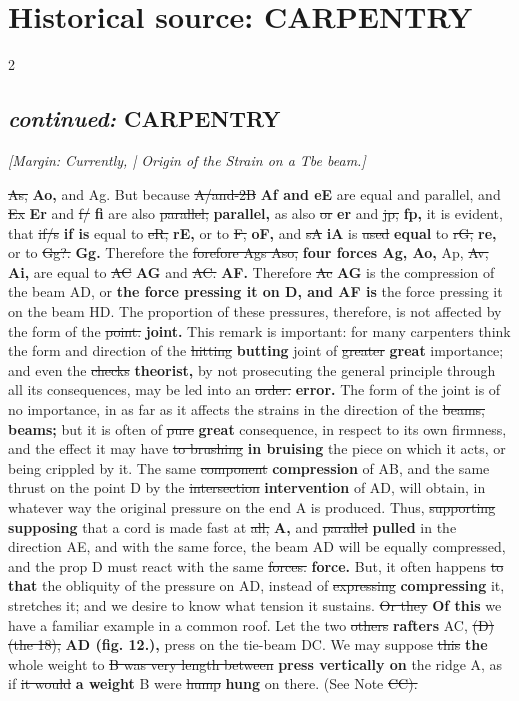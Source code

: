 \documentclass[10pt]{article}
\begin{document}
\section*{Historical source: CARPENTRY}
\begin{multicols}{2}
\subsection*{\textit{continued:} CARPENTRY}
{\small\itshape [Margin: Currently, | Origin of the Strain on a Tbe beam.]}\par
\sout{As,} \textbf{Ao,} and Ag. But because \sout{A/and-2B} \textbf{Af and eE} are equal and parallel, and \sout{Ex} \textbf{Er} and \sout{f/} \textbf{fi} are also \sout{parallel;} \textbf{parallel,} as also \sout{or} \textbf{er} and \sout{jp,} \textbf{fp,} it is evident, that \sout{if/s} \textbf{if is} equal to \sout{eR,} \textbf{rE,} or to \sout{F,} \textbf{oF,} and \sout{sA} \textbf{iA} is \sout{used} \textbf{equal} to \sout{rG,} \textbf{re,} or to \sout{Gg?.} \textbf{Gg.} Therefore the \sout{forefore Ags Aso,} \textbf{four forces Ag, Ao,} Ap, \sout{Av,} \textbf{Ai,} are equal to \sout{AC} \textbf{AG} and \sout{AC.} \textbf{AF.} Therefore \sout{Ac} \textbf{AG} is the compression of the beam AD, or \textbf{the force pressing it on D, and AF is} the force pressing it on the beam HD. The proportion of these pressures, therefore, is not affected by the form of the \sout{point.} \textbf{joint.} This remark is important: for many carpenters think the form and direction of the \sout{hitting} \textbf{butting} joint of \sout{greater} \textbf{great} importance; and even the \sout{checks} \textbf{theorist,} by not prosecuting the general principle through all its consequences, may be led into an \sout{order.} \textbf{error.} The form of the joint is of no importance, in as far as it affects the strains in the direction of the \sout{beams,} \textbf{beams;} but it is often of \sout{pure} \textbf{great} consequence, in respect to its own firmness, and the effect it may have \sout{to brushing} \textbf{in bruising} the piece on which it acts, or being crippled by it. The same \sout{component} \textbf{compression} of AB, and the same thrust on the point D by the \sout{intersection} \textbf{intervention} of AD, will obtain, in whatever way the original pressure on the end A is produced. Thus, \sout{supporting} \textbf{supposing} that a cord is made fast at \sout{all,} \textbf{A,} and \sout{parallel} \textbf{pulled} in the direction AE, and with the same force, the beam AD will be equally compressed, and the prop D must react with the same \sout{forces.} \textbf{force.} But, it often happens \sout{to} \textbf{that} the obliquity of the pressure on AD, instead of \sout{expressing} \textbf{compressing} it, stretches it; and we desire to know what tension it sustains. \sout{Or they} \textbf{Of this} we have a familiar example in a common roof. Let the two \sout{others} \textbf{rafters} AC, \sout{(D) (the 18),} \textbf{AD (fig. 12.),} press on the tie-beam DC. We may suppose \sout{this} \textbf{the} whole weight to \sout{B was very length between} \textbf{press vertically on} the ridge A, as if \sout{it would} \textbf{a weight} B were \sout{hump} \textbf{hung} on there. (See Note \sout{CC).} 
\end{multicols}
\end{document}
